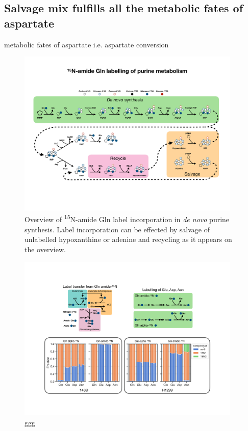 \subsection{Salvage mix fulfills all the metabolic fates of aspartate}

metabolic fates of aspartate i.e. aspartate conversion 


\begin{figure}
    \centering
    \includegraphics[width=0.95\textwidth]{figures/chap2/purine_tracing_overvew.pdf}
    \caption[Purine metabolism \textsuperscript{15}N-amide Gln tracing overview]{
    Overview of \textsuperscript{15}N-amide Gln label incorporation in \textit{de novo} purine synthesis.
    Label incorporation can be effected by salvage of unlabelled hypoxanthine or adenine and recycling as it appears on the overview.
    }
    \label{fig:ch2:pur_tr_ov}
\end{figure}





\begin{figure}
    \centering
    \includegraphics[width=0.95\textwidth]{figures/chap2/gln_lab_tranfr.pdf}
    \caption[Gln amide to alpha \textsuperscript{15}N transfer]{
    ggg
    }
    \label{fig:ch2:gln_lab_tranfr}
\end{figure}



